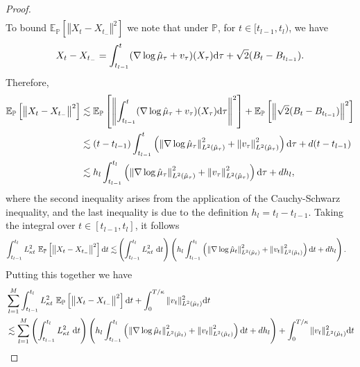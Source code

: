 \begin{proof}
\begin{align*}
\end{align*}
To bound $\mathbb{E}_{\mathbb{P}} \left[\left\Vert X_t-X_{t_-}\right\Vert^2\right]$ we note that under $\mathbb{P}$, for $t\in [t_{l-1}, t_l)$, we have
\begin{equation*}
    X_t - X_{t_-} = \int_{t_{l-1}}^t (\nabla\log {\hat{\mu}}_\tau + v_\tau) (X_\tau) \mathrm{d} \tau + \sqrt{2}(B_t - B_{t_{l-1}}).
\end{equation*}
Therefore, 
\begin{align*}
    \mathbb{E}_{\mathbb{P}} \left[\left\Vert X_t-X_{t_-}\right\Vert^2\right] &\lesssim \mathbb{E}_{\mathbb{P}}\left[\left\Vert\int_{t_{l-1}}^t (\nabla\log {\hat{\mu}}_\tau + v_\tau) (X_\tau) \mathrm{d} \tau\right\Vert^2\right]  + \mathbb{E}_{\mathbb{P}} \left[\left\Vert \sqrt{2}(B_t - B_{t_{l-1}})\right\Vert^2\right]\\
    &\lesssim (t-t_{l-1}) \int_{t_{l-1}}^t \left(\left\Vert\nabla\log {\hat{\mu}}_\tau \right\Vert_{L^2({\hat{\mu}}_\tau)}^2 + \left\Vert v_\tau \right\Vert_{L^2({\hat{\mu}}_\tau)}^2\right)\mathrm{d} \tau  + d(t-t_{l-1})\\
    &\lesssim h_l \int_{t_{l-1}}^{t_l} \left(\left\Vert\nabla\log {\hat{\mu}}_\tau \right\Vert_{L^2({\hat{\mu}}_\tau)}^2 + \left\Vert v_\tau \right\Vert_{L^2({\hat{\mu}}_\tau)}^2\right)\mathrm{d} \tau  + d h_l,
\end{align*}
where the second inequality arises from the application of the Cauchy-Schwarz inequality, and the last inequality is due to the definition $h_l = t_l - t_{l-1}$.
Taking the integral over $t\in[t_{l-1}, t_l]$, it follows
\begin{align*}
    \int_{t_{l-1}}^{t_l}{L}_{\kappa t}^2 \ \mathbb{E}_{\mathbb{P}} \left[\left\Vert X_t-X_{t_-}\right\Vert^2\right] \mathrm{d} t \lesssim &  \left(\int_{t_{l-1}}^{t_l}{L}_{\kappa t}^2 \ \mathrm{d} t\right) \left(h_l \int_{t_{l-1}}^{t_l} \left(\left\Vert\nabla\log {\hat{\mu}}_t \right\Vert_{L^2({\hat{\mu}}_t)}^2 + \left\Vert v_t \right\Vert_{L^2({\hat{\mu}}_t)}^2\right)\mathrm{d} t  + d h_l\right).
\end{align*}
Putting this together we have
\begin{align}
&\sum_{l=1}^M\int_{t_{l-1}}^{t_l} L_{\kappa t}^2 \ \mathbb{E}_{\mathbb{P}} \left[\left\Vert X_t-X_{t_-}\right\Vert^2\right]\md t+ \int_0^{T/\kappa} \Vert v_t\Vert^2_{L^2({\hat{\mu}}_t)} \md t \nonumber\\
    &\lesssim \sum_{l=1}^M \left(\int_{t_{l-1}}^{t_l} L_{\kappa t}^2 \ \md t\right) \left(h_l \int_{t_{l-1}}^{t_l} \left(\left\Vert\nabla\log {\hat{\mu}}_t \right\Vert_{L^2({\hat{\mu}}_t)}^2 + \left\Vert v_t \right\Vert_{L^2({\hat{\mu}}_t)}^2\right)\md t  + d h_l\right)+ \int_0^{T/\kappa} \Vert v_t\Vert^2_{L^2({\hat{\mu}}_t)} \md t \nonumber\\

\end{align}
\end{proof}
